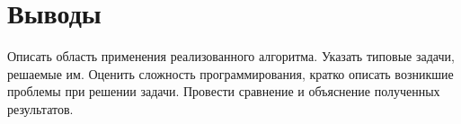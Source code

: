 \section{Выводы}
Описать область применения реализованного алгоритма. Указать типовые задачи, решаемые им. Оценить сложность программирования, кратко описать возникшие проблемы при решении задачи. Провести сравнение и объяснение полученных результатов.

\pagebreak

